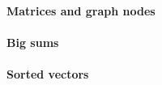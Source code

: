 \paragraph{Matrices and graph nodes}



\paragraph{Big sums}
\label{subsect.sums}





\paragraph{Sorted vectors}


